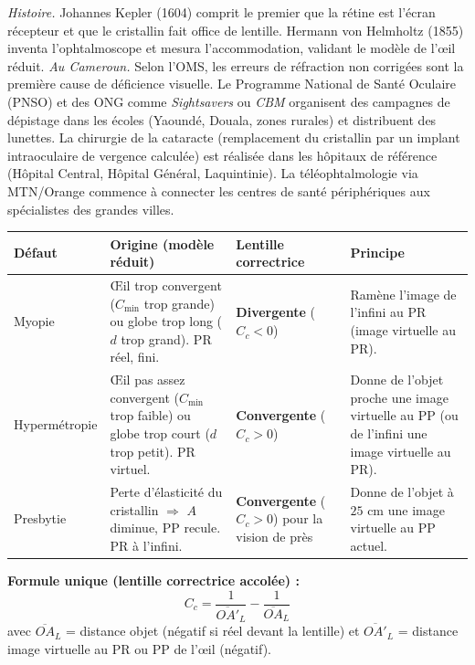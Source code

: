 \documentclass[11pt]{article}
\newcommand{\cle}[1]{{\popxbold\color{popdark}#1}}
\begin{document}
\begin{savaistu}
\emph{Histoire.} Johannes Kepler (1604) comprit le premier que la rétine est l'écran récepteur et que le cristallin fait office de lentille. Hermann von Helmholtz (1855) inventa l'ophtalmoscope et mesura l'accommodation, validant le modèle de l'œil réduit.
\emph{Au Cameroun.} Selon l'OMS, les erreurs de réfraction non corrigées sont la première cause de déficience visuelle. Le Programme National de Santé Oculaire (PNSO) et des ONG comme \emph{Sightsavers} ou \emph{CBM} organisent des campagnes de dépistage dans les écoles (Yaoundé, Douala, zones rurales) et distribuent des lunettes. La chirurgie de la cataracte (remplacement du cristallin par un implant intraoculaire de vergence calculée) est réalisée dans les hôpitaux de référence (Hôpital Central, Hôpital Général, Laquintinie). La téléophtalmologie via MTN/Orange commence à connecter les centres de santé périphériques aux spécialistes des grandes villes.
\end{savaistu}

\begin{aretenir}
\begin{center}
\begin{tabularx}{\linewidth}{|l|X|X|X|}\hline
\rowcolor{popblueL}
\textbf{Défaut} & \textbf{Origine (modèle réduit)} & \textbf{Lentille correctrice} & \textbf{Principe} \\ \hline
\cle{Myopie} & Œil trop convergent ($C_{\min}$ trop grande) ou globe trop long ($d$ trop grand). PR réel, fini. & \textbf{Divergente} ($C_c < 0$) & Ramène l'image de l'infini au PR (image virtuelle au PR). \\ \hline
\cle{Hypermétropie} & Œil pas assez convergent ($C_{\min}$ trop faible) ou globe trop court ($d$ trop petit). PR virtuel. & \textbf{Convergente} ($C_c > 0$) & Donne de l'objet proche une image virtuelle au PP (ou de l'infini une image virtuelle au PR). \\ \hline
\cle{Presbytie} & Perte d'élasticité du cristallin $\Rightarrow$ $A$ diminue, PP recule. PR à l'infini. & \textbf{Convergente} ($C_c > 0$) pour la vision de près & Donne de l'objet à $25$ cm une image virtuelle au PP actuel. \\ \hline
\end{tabularx}
\end{center}
\textbf{Formule unique (lentille correctrice accolée) :}
\[ C_c = \frac{1}{\overline{OA'}_L} - \frac{1}{\overline{OA}_L} \]
avec $\overline{OA}_L$ = distance objet (négatif si réel devant la lentille) et $\overline{OA'}_L$ = distance image virtuelle au PR ou PP de l'œil (négatif).
\end{aretenir}
\end{document}
